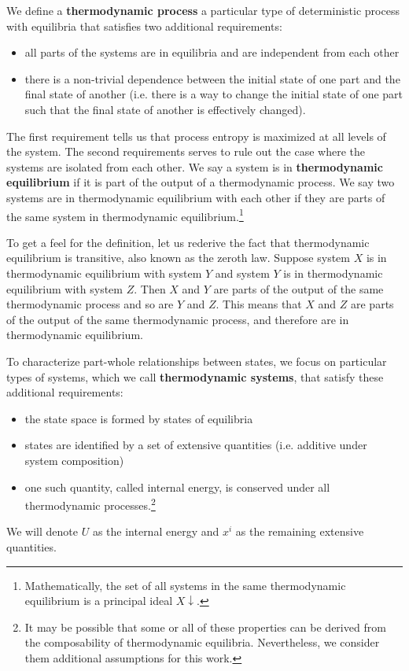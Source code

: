 \documentclass[letterpaper,twocolumn]{article}
\begin{document}
We define a \textbf{thermodynamic process} a particular type of deterministic process with equilibria that satisfies two additional requirements:
\begin{itemize}
	\item all parts of the systems are in equilibria and are independent from each other
	\item there is a non-trivial dependence between the initial state of one part and the final state of another (i.e. there is a way to change the initial state of one part such that the final state of another is effectively changed).
\end{itemize}
The first requirement tells us that process entropy is maximized at all levels of the system. The second requirements serves to rule out the case where the systems are isolated from each other. We say a system is in \textbf{thermodynamic equilibrium} if it is part of the output of a thermodynamic process. We say two systems are in thermodynamic equilibrium with each other if they are parts of the same system in thermodynamic equilibrium.\footnote{Mathematically, the set of all systems in the same thermodynamic equilibrium is a principal ideal $X\!\! \downarrow$.}

To get a feel for the definition, let us rederive the fact that thermodynamic equilibrium is transitive, also known as the zeroth law. Suppose system $X$ is in thermodynamic equilibrium with system $Y$ and system $Y$ is in thermodynamic equilibrium with system $Z$. Then $X$ and $Y$ are parts of the output of the same thermodynamic process and so are $Y$ and $Z$. This means that $X$ and $Z$ are parts of the output of the same thermodynamic process, and therefore are in thermodynamic equilibrium.

To characterize part-whole relationships between states, we focus on particular types of systems, which we call \textbf{thermodynamic systems}, that satisfy these additional requirements: 
\begin{itemize}
	\item the state space is formed by states of equilibria
	\item states are identified by a set of extensive quantities (i.e. additive under system composition)
	\item one such quantity, called internal energy, is conserved under all thermodynamic processes.\footnote{It may be possible that some or all of these properties can be derived from the composability of thermodynamic equilibria. Nevertheless, we consider them additional assumptions for this work.
	}
\end{itemize}
We will denote $U$ as the internal energy and $x^i$ as the remaining extensive quantities.
\end{document}
